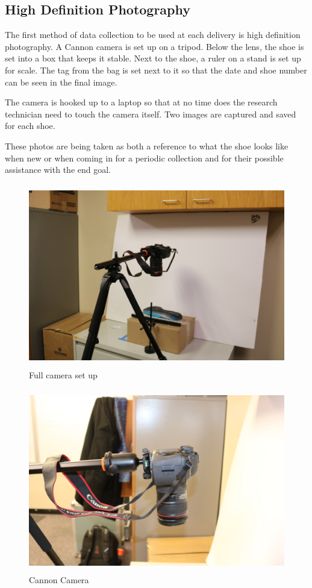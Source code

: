 \subsection{High Definition Photography}

   The first method of data collection to be used at each delivery is high definition photography. A Cannon camera is set up on a tripod. Below the lens, the shoe is set into a box that keeps it stable. Next to the shoe, a ruler on a stand is set up for scale. The tag from the bag is set next to it so that the date and shoe number can be seen in the final image. 
   
   The camera is hooked up to a laptop so that at no time does the research technician need to touch the camera itself. Two images are captured and saved for each shoe. 
   
   These photos are being taken as both a reference to what the shoe looks like when new or when coming in for a periodic collection and for their possible assistance with the end goal. 

\begin{figure}[!htp]
\centering
\includegraphics[width=12cm, height=8cm]{Original_Camera_Set}
\caption{Full camera set up}
\label{Image 4}
\end{figure}

\begin{figure}[!htp]
\centering
\includegraphics[width=12cm, height=8cm]{Camera}
\caption{Cannon Camera}
\label{Image 5}
\end{figure}

